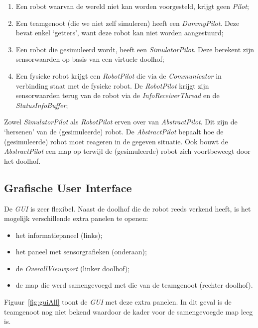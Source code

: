 \documentclass[eind]{penoverslag}
\begin{document}
\begin{enumerate}
	\item Een robot waarvan de wereld niet kan worden voorgesteld, krijgt geen \textit{Pilot};
	\item Een teamgenoot (die we niet zelf simuleren) heeft een \textit{DummyPilot}. Deze bevat enkel `getters', want deze robot kan niet worden aangestuurd;
	\item Een robot die gesimuleerd wordt, heeft een \textit{SimulatorPilot}. Deze berekent zijn sensorwaarden op basis van een virtuele doolhof;
	\item Een fysieke robot krijgt een \textit{RobotPilot} die via de \textit{Communicator} in verbinding staat met de fysieke robot. De \textit{RobotPilot} krijgt zijn sensorwaarden terug van de robot via de \textit{InfoReceiverThread} en de \textit{StatusInfoBuffer};
\end{enumerate}

Zowel \textit{SimulatorPilot} als \textit{RobotPilot} erven over van \textit{AbstractPilot}. Dit zijn de `hersenen' van de (gesimuleerde) robot. De \textit{AbstractPilot} bepaalt hoe de (gesimuleerde) robot moet reageren in de gegeven situatie. Ook bouwt de \textit{AbstractPilot} een map op terwijl de (gesimuleerde) robot zich voortbeweegt door het doolhof.

\subsection{Grafische User Interface}
\label{ssec:GUI}
De \textit{GUI} is zeer flexibel. Naast de doolhof die de robot reeds verkend heeft, is het mogelijk verschillende extra panelen te openen:

\begin{itemize}
	\item het informatiepaneel (links);
	\item het paneel met sensorgrafieken (onderaan);
	\item de \textit{OverallVieuwport} (linker doolhof);
	\item de map die werd samengevoegd met die van de teamgenoot (rechter doolhof).
\end{itemize}

Figuur~\ref{fig:guiAll} toont de \textit{GUI} met deze extra panelen. In dit geval is de teamgenoot nog niet bekend waardoor de kader voor de samengevoegde map leeg is.\\
\end{document}
